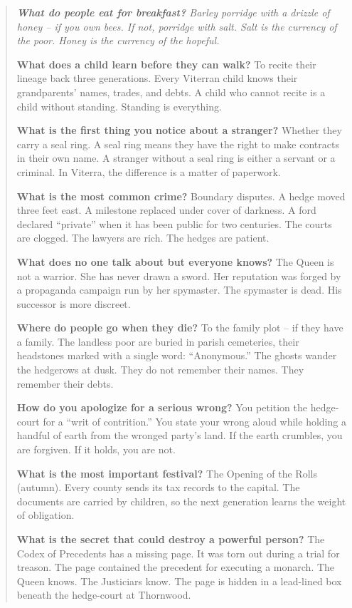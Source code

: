 \documentclass[12pt,oneside]{book}
\newenvironment{almanac}
  {\begin{quote}\small\itshape}
  {\end{quote}}
\begin{document}
\begin{almanac}
\textbf{What do people eat for breakfast?} Barley porridge with a drizzle of honey -- if you own bees. If not, porridge with salt. Salt is the currency of the poor. Honey is the currency of the hopeful.

\textbf{What does a child learn before they can walk?} To recite their lineage back three generations. Every Viterran child knows their grandparents' names, trades, and debts. A child who cannot recite is a child without standing. Standing is everything.

\textbf{What is the first thing you notice about a stranger?} Whether they carry a seal ring. A seal ring means they have the right to make contracts in their own name. A stranger without a seal ring is either a servant or a criminal. In Viterra, the difference is a matter of paperwork.

\textbf{What is the most common crime?} Boundary disputes. A hedge moved three feet east. A milestone replaced under cover of darkness. A ford declared ``private'' when it has been public for two centuries. The courts are clogged. The lawyers are rich. The hedges are patient.

\textbf{What does no one talk about but everyone knows?} The Queen is not a warrior. She has never drawn a sword. Her reputation was forged by a propaganda campaign run by her spymaster. The spymaster is dead. His successor is more discreet.

\textbf{Where do people go when they die?} To the family plot -- if they have a family. The landless poor are buried in parish cemeteries, their headstones marked with a single word: ``Anonymous.'' The ghosts wander the hedgerows at dusk. They do not remember their names. They remember their debts.

\textbf{How do you apologize for a serious wrong?} You petition the hedge-court for a ``writ of contrition.'' You state your wrong aloud while holding a handful of earth from the wronged party's land. If the earth crumbles, you are forgiven. If it holds, you are not.

\textbf{What is the most important festival?} The Opening of the Rolls (autumn). Every county sends its tax records to the capital. The documents are carried by children, so the next generation learns the weight of obligation.

\textbf{What is the secret that could destroy a powerful person?} The Codex of Precedents has a missing page. It was torn out during a trial for treason. The page contained the precedent for executing a monarch. The Queen knows. The Justiciars know. The page is hidden in a lead-lined box beneath the hedge-court at Thornwood.
\end{almanac}
\end{document}
